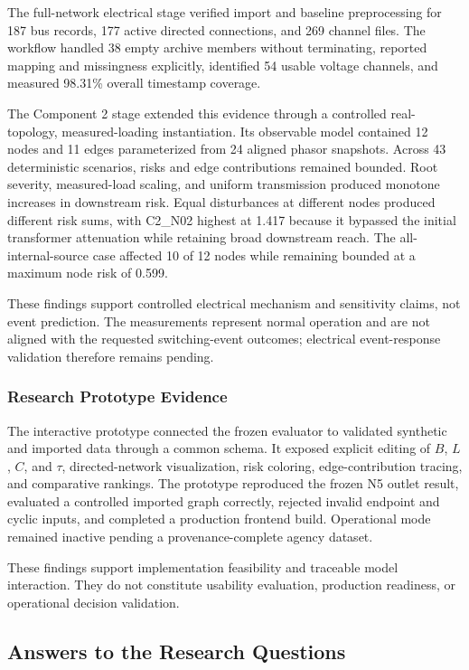 The full-network electrical stage verified import and baseline
preprocessing for 187 bus records, 177 active directed connections, and
269 channel files. The workflow handled 38 empty archive members without
terminating, reported mapping and missingness explicitly, identified 54
usable voltage channels, and measured 98.31\% overall timestamp coverage.

The Component 2 stage extended this evidence through a controlled
real-topology, measured-loading instantiation. Its observable model contained
12 nodes and 11 edges parameterized from 24 aligned phasor snapshots.
Across 43 deterministic scenarios, risks and edge contributions remained
bounded. Root severity, measured-load scaling, and uniform transmission
produced monotone increases in downstream risk. Equal disturbances at
different nodes produced different risk sums, with C2\_N02 highest at
1.417 because it bypassed the initial transformer attenuation while
retaining broad downstream reach. The all-internal-source case affected
10 of 12 nodes while remaining bounded at a maximum node risk of 0.599.

These findings support controlled electrical mechanism and sensitivity
claims, not event prediction. The measurements represent normal operation
and are not aligned with the requested switching-event outcomes;
electrical event-response validation therefore remains pending.

\subsubsection{Research Prototype Evidence}

The interactive prototype connected the frozen evaluator to validated
synthetic and imported data through a common schema. It exposed explicit
editing of $B$, $L$, $C$, and $\tau$, directed-network visualization,
risk coloring, edge-contribution tracing, and comparative rankings. The
prototype reproduced the frozen N5 outlet result, evaluated a controlled
imported graph correctly, rejected invalid endpoint and cyclic inputs,
and completed a production frontend build. Operational mode remained
inactive pending a provenance-complete agency dataset.

These findings support implementation feasibility and traceable model
interaction. They do not constitute usability evaluation, production
readiness, or operational decision validation.

\subsection{Answers to the Research Questions}

